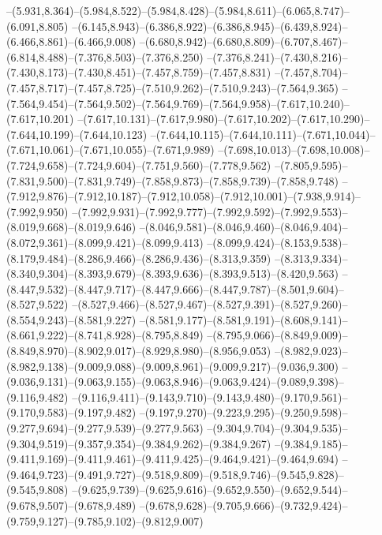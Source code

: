   --(5.931,8.364)--(5.984,8.522)--(5.984,8.428)--(5.984,8.611)--(6.065,8.747)--(6.091,8.805)%
  --(6.145,8.943)--(6.386,8.922)--(6.386,8.945)--(6.439,8.924)--(6.466,8.861)--(6.466,9.008)%
  --(6.680,8.942)--(6.680,8.809)--(6.707,8.467)--(6.814,8.488)--(7.376,8.503)--(7.376,8.250)%
  --(7.376,8.241)--(7.430,8.216)--(7.430,8.173)--(7.430,8.451)--(7.457,8.759)--(7.457,8.831)%
  --(7.457,8.704)--(7.457,8.717)--(7.457,8.725)--(7.510,9.262)--(7.510,9.243)--(7.564,9.365)%
  --(7.564,9.454)--(7.564,9.502)--(7.564,9.769)--(7.564,9.958)--(7.617,10.240)--(7.617,10.201)%
  --(7.617,10.131)--(7.617,9.980)--(7.617,10.202)--(7.617,10.290)--(7.644,10.199)--(7.644,10.123)%
  --(7.644,10.115)--(7.644,10.111)--(7.671,10.044)--(7.671,10.061)--(7.671,10.055)--(7.671,9.989)%
  --(7.698,10.013)--(7.698,10.008)--(7.724,9.658)--(7.724,9.604)--(7.751,9.560)--(7.778,9.562)%
  --(7.805,9.595)--(7.831,9.500)--(7.831,9.749)--(7.858,9.873)--(7.858,9.739)--(7.858,9.748)%
  --(7.912,9.876)--(7.912,10.187)--(7.912,10.058)--(7.912,10.001)--(7.938,9.914)--(7.992,9.950)%
  --(7.992,9.931)--(7.992,9.777)--(7.992,9.592)--(7.992,9.553)--(8.019,9.668)--(8.019,9.646)%
  --(8.046,9.581)--(8.046,9.460)--(8.046,9.404)--(8.072,9.361)--(8.099,9.421)--(8.099,9.413)%
  --(8.099,9.424)--(8.153,9.538)--(8.179,9.484)--(8.286,9.466)--(8.286,9.436)--(8.313,9.359)%
  --(8.313,9.334)--(8.340,9.304)--(8.393,9.679)--(8.393,9.636)--(8.393,9.513)--(8.420,9.563)%
  --(8.447,9.532)--(8.447,9.717)--(8.447,9.666)--(8.447,9.787)--(8.501,9.604)--(8.527,9.522)%
  --(8.527,9.466)--(8.527,9.467)--(8.527,9.391)--(8.527,9.260)--(8.554,9.243)--(8.581,9.227)%
  --(8.581,9.177)--(8.581,9.191)--(8.608,9.141)--(8.661,9.222)--(8.741,8.928)--(8.795,8.849)%
  --(8.795,9.066)--(8.849,9.009)--(8.849,8.970)--(8.902,9.017)--(8.929,8.980)--(8.956,9.053)%
  --(8.982,9.023)--(8.982,9.138)--(9.009,9.088)--(9.009,8.961)--(9.009,9.217)--(9.036,9.300)%
  --(9.036,9.131)--(9.063,9.155)--(9.063,8.946)--(9.063,9.424)--(9.089,9.398)--(9.116,9.482)%
  --(9.116,9.411)--(9.143,9.710)--(9.143,9.480)--(9.170,9.561)--(9.170,9.583)--(9.197,9.482)%
  --(9.197,9.270)--(9.223,9.295)--(9.250,9.598)--(9.277,9.694)--(9.277,9.539)--(9.277,9.563)%
  --(9.304,9.704)--(9.304,9.535)--(9.304,9.519)--(9.357,9.354)--(9.384,9.262)--(9.384,9.267)%
  --(9.384,9.185)--(9.411,9.169)--(9.411,9.461)--(9.411,9.425)--(9.464,9.421)--(9.464,9.694)%
  --(9.464,9.723)--(9.491,9.727)--(9.518,9.809)--(9.518,9.746)--(9.545,9.828)--(9.545,9.808)%
  --(9.625,9.739)--(9.625,9.616)--(9.652,9.550)--(9.652,9.544)--(9.678,9.507)--(9.678,9.489)%
  --(9.678,9.628)--(9.705,9.666)--(9.732,9.424)--(9.759,9.127)--(9.785,9.102)--(9.812,9.007)%
